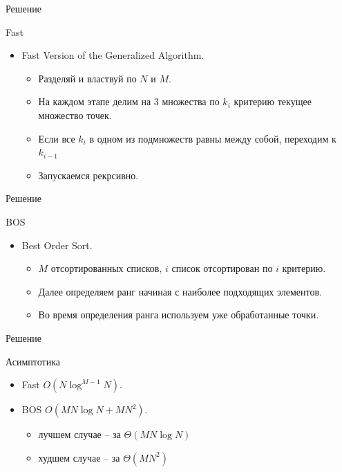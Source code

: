 \documentclass{beamer}
\begin{document}
\begin{frame}{Решение}
\begin{block}{Fast}
\begin{center}
\end{center}
\begin{itemize}
\item Fast Version of the Generalized Algorithm.
\begin{itemize}
\item Разделяй и властвуй по $N$ и $M$. 
\item На каждом этапе делим на 3 множества по $k_i$ критерию текущее множество точек.
\item Если все $k_i$ в одном из подмножеств равны между собой, переходим к $k_{i-1}$
\item Запускаемся рекрсивно.
\end{itemize}
\end{itemize}
\end{block}
\end{frame}

\begin{frame}{Решение}
\begin{block}{BOS}
\begin{center}
\end{center}
\begin{itemize}
\item Best Order Sort.
\begin{itemize}
\item $M$ отсортированных списков, $i$ список отсортирован по $i$ критерию. 
\item Далее определяем ранг начиная с наиболее подходящих элементов. 
\item Во время определения ранга используем уже обработанные точки.
\end{itemize}
\end{itemize}
\end{block}
\end{frame}


\begin{frame}{Решение}
\begin{block}{Асимптотика}
\begin{itemize}
\item Fast $O(N \log^{M-1}N)$.
\item BOS $O(MN \log N + MN^2)$.
\begin{itemize}
\item лучшем случае -- за $\Theta(MN\log{N})$
\item худшем случае -- за $\Theta(MN^2)$
\end{itemize}

\end{itemize}
\end{block}
\end{frame}
\end{document}
